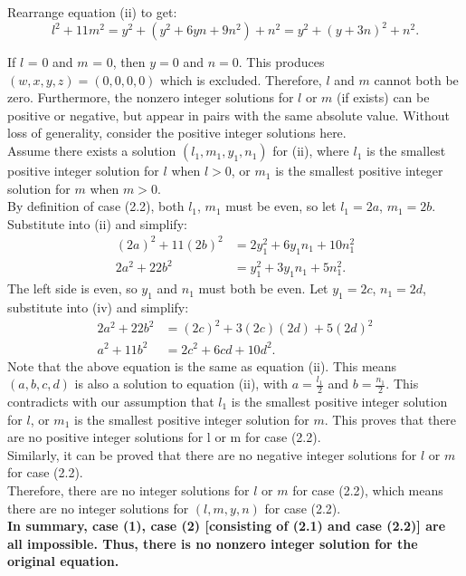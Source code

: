 \documentclass{article}
\begin{document}
Rearrange equation (ii) to get:
$$l^2 + 11m^2 = y^2 + (y^2 + 6yn + 9n^2) + n^2 = y^2 + (y + 3n)^2 + n^2.$$

If $l$ = 0 and $m$ = 0, then $y =0$ and $n =0$. This produces $(w,x,y,z) = (0,0,0,0)$ which is excluded. Therefore, $l$ and $m$ cannot both be zero. Furthermore, the nonzero integer solutions for $l$ or $m$ (if exists) can be positive or negative, but appear in pairs with the same absolute value. Without loss of generality, consider the positive integer solutions here. \\

Assume there exists a solution $(l_1,m_1,y_1,n_1)$ for (ii), where $l_1$ is the smallest positive integer solution for $l$ when $l > 0$, or $m_1$ is the smallest positive integer solution for $m$ when $m > 0$. \\
By definition of case (2.2), both $l_1$, $m_1$ must be even, so let $l_1 = 2a$, $m_1 = 2b$. Substitute into (ii) and simplify:
\begin{align*}
    (2a)^2 + 11(2b)^2 &= 2y_1^2 + 6y_1n_1 + 10n_1^2 \\
    2a^2 + 22b^2 &= y_1^2 + 3y_1n_1 + 5n_1^2. \tag{iv}
\end{align*}
The left side is even, so $y_1$ and $n_1$ must both be even. Let $y_1 = 2c$, $n_1 = 2d$, substitute into (iv) and simplify:
\begin{align*}
    2a^2 + 22b^2 &= (2c)^2 + 3(2c)(2d) + 5(2d)^2 \\
    a^2 + 11b^2 &= 2c^2 + 6cd + 10d^2.
\end{align*}
Note that the above equation is the same as equation (ii). This means $(a,b,c,d)$ is also a solution to equation (ii), with $a = \frac{l_1}{2}$ and $b = \frac{n_1}{2}$. This contradicts with our assumption that $l_1$ is the smallest positive integer solution for $l$, or $m_1$ is the smallest positive integer solution for $m$. This proves that there are no positive integer solutions for l or m for case (2.2).\\
Similarly, it can be proved that there are no negative integer solutions for $l$ or $m$ for case (2.2).\\
Therefore, there are no integer solutions for $l$ or $m$ for case (2.2), which means there are no integer solutions for $(l,m,y,n)$ for case (2.2).\\

\textbf{In summary, case (1), case (2) [consisting of (2.1) and case (2.2)] are all impossible. Thus, there is no nonzero integer solution for the original equation.}
\end{document}

